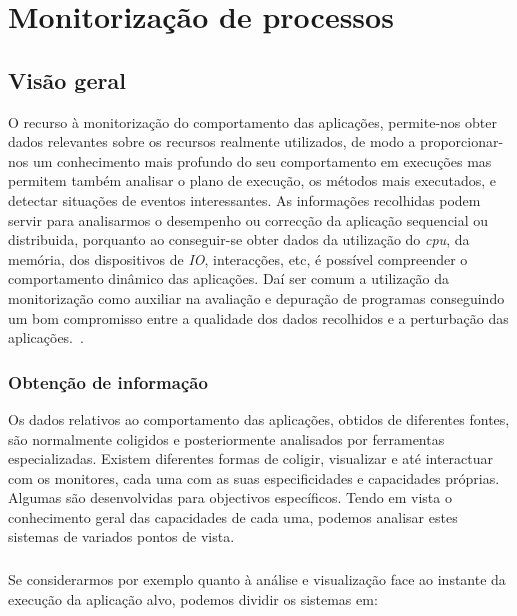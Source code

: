 \chapter{Monitorização de processos}
\label{cap:trabrelacionado}
 
\section{Visão geral} \label{sect:descricao}

O recurso à monitorização do comportamento das aplicações, permite-nos obter dados relevantes sobre os recursos realmente utilizados, de modo a proporcionar-nos um conhecimento mais profundo do seu comportamento em execuções mas permitem também analisar o plano de execução, os métodos mais executados, e detectar situações de eventos interessantes.
As informações recolhidas podem servir para analisarmos o desempenho ou correcção da aplicação sequencial ou distribuida, porquanto ao conseguir-se obter dados da utilização do \textit{cpu}, da memória, dos dispositivos de \textit{IO}, interacções, etc, é possível compreender o comportamento dinâmico das aplicações.
Daí ser comum a utilização da monitorização como auxiliar na avaliação e depuração de programas conseguindo um bom compromisso entre a qualidade dos dados recolhidos e a perturbação das aplicações.~\cite{DuartePhd05}.

\subsection{Obtenção de informação}\label{sect:instrumentation_overview}

Os dados relativos ao comportamento das aplicações, obtidos de diferentes fontes, são normalmente coligidos e posteriormente analisados por ferramentas especializadas.
Existem diferentes formas de coligir, visualizar e até interactuar com os monitores, cada uma com as suas especificidades e capacidades próprias.
Algumas são desenvolvidas para objectivos específicos.
Tendo em vista o conhecimento geral das capacidades de cada uma, podemos analisar estes sistemas de variados pontos de vista.

\paragraph*{}
Se considerarmos por exemplo quanto à análise e visualização face ao instante da execução da aplicação alvo, podemos dividir os sistemas em:
 
